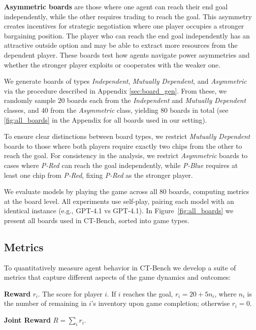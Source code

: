\documentclass{article} %
\newcommand{\CT}{CT-Bench\xspace}
\newcommand{\GPT}{GPT-4.1\xspace}
\begin{document}
\textbf{Asymmetric boards} are those where one agent can reach their end goal independently, while the other requires trading to reach the goal. This asymmetry creates incentives for strategic negotiation where one player occupies a stronger bargaining position. The player who can reach the end goal independently has an attractive outside option and may be able to extract more resources from the dependent player. These boards test how agents navigate power asymmetries and whether the stronger player exploits or cooperates with the weaker one.


We generate boards of types \textit{Independent}, \textit{Mutually Dependent}, and \textit{Asymmetric} via the procedure described in Appendix \ref{sec:board_gen}. From these, we randomly sample $20$ boards each from the \textit{Independent} and \textit{Mutually Dependent} classes, and $40$ from the \textit{Asymmetric} class, yielding $80$ boards in total (see \cref{fig:all_boards} in the Appendix for all boards used in our setting).

To ensure clear distinctions between board types, we restrict \textit{Mutually Dependent} boards to those where both players require exactly two chips from the other to reach the goal. For consistency in the analysis, we restrict \textit{Asymmetric} boards to cases where \textit{P-Red} can reach the goal independently, while \textit{P-Blue} requires at least one chip from \textit{P-Red}, fixing \textit{P-Red} as the stronger player.

We evaluate models by playing the game across all $80$ boards, computing metrics at the board level. All experiments use self-play, pairing each model with an identical instance (e.g., \GPT vs \GPT). In Figure~\ref{fig:all_boards} we present all boards used in \CT, sorted into game types. 


\subsection{Metrics}
\label{subsec:metrics}

To quantitatively measure agent behavior in \CT we develop a suite of metrics that capture different aspects of the game dynamics and outcomes:

\textbf{Reward} $r_i$. The score for player $i$. If $i$ reaches the goal, $r_i = 20 + 5 n_i$, where $n_i$ is the number of remaining in $i$'s inventory upon game completion; otherwise $r_i = 0$.

\textbf{Joint Reward} $R = \sum_i r_i$.
\end{document}
